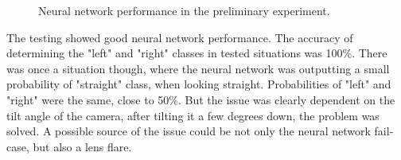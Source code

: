 \begin{figure}[!h]
  \begin{minipage}{.5\linewidth}
  \centering
  \end{minipage}
  \begin{minipage}{.5\linewidth}
  \centering	
  

  \end{minipage}
  
  
  \caption{Neural network performance in the preliminary experiment.}
  \label{fig:test_nn}
\end{figure}

The testing showed good neural network performance. The accuracy of determining the "left" and "right" classes in tested situations was 100\%. There was once a situation though, where the neural network was outputting a small probability of "straight" class, when looking straight. Probabilities of "left" and "right" were the same, close to 50\%. But the issue was clearly dependent on the tilt angle of the camera, after tilting it a few degrees down, the problem was solved. A possible source of the issue could be not only the neural network fail-case, but also a lens flare.

